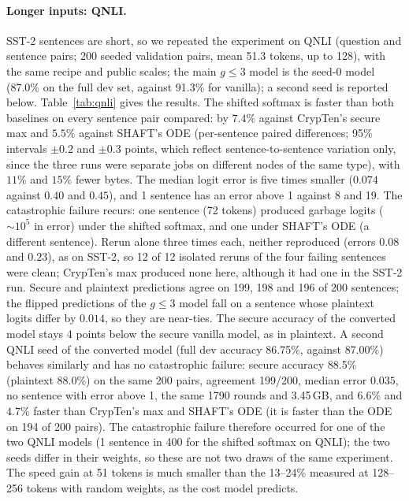 \documentclass[11pt]{article}
\begin{document}
\paragraph{Longer inputs: QNLI.} SST-2 sentences are short, so we repeated the experiment on QNLI (question and sentence pairs; 200
seeded validation pairs, mean 51.3 tokens, up to 128), with the same recipe and public scales; the main $g\le3$ model is the seed-0
model (87.0\% on the full dev set, against 91.3\% for vanilla); a second seed is reported below. Table~\ref{tab:qnli} gives the results. The shifted softmax is faster
than both baselines on every sentence pair compared: by $7.4\%$ against CrypTen's secure max and $5.5\%$ against SHAFT's ODE
(per-sentence paired differences; 95\% intervals $\pm0.2$ and $\pm0.3$ points, which reflect sentence-to-sentence variation only, since the
three runs were separate jobs on different nodes of the same type), with $11\%$ and $15\%$ fewer bytes. The median logit error is five
times smaller ($0.074$ against $0.40$ and $0.45$), and 1 sentence has an error above 1 against 8 and 19. The catastrophic failure
recurs: one sentence (72 tokens) produced garbage logits ($\sim\!10^{5}$ in error) under the shifted softmax, and one under SHAFT's ODE
(a different sentence). Rerun alone three times each, neither reproduced (errors $0.08$ and $0.23$), as on SST-2, so 12 of 12 isolated
reruns of the four failing sentences were clean; CrypTen's max produced none here, although it had one in the SST-2 run. Secure and plaintext predictions
agree on 199, 198 and 196 of 200 sentences; the flipped predictions of the $g\le3$ model fall on a sentence whose plaintext logits differ by
$0.014$, so they are near-ties. The secure accuracy of the converted model stays 4 points below the secure vanilla model, as in plaintext.
A second QNLI seed of the converted model (full dev accuracy 86.75\%, against 87.00\%) behaves similarly and has no catastrophic failure: secure
accuracy 88.5\% (plaintext 88.0\%) on the same 200 pairs, agreement 199/200, median error $0.035$, no sentence with error above 1, the same
1790 rounds and 3.45\,GB, and $6.6\%$ and $4.7\%$ faster than CrypTen's max and SHAFT's ODE (it is faster than the ODE on 194 of 200 pairs). The
catastrophic failure therefore occurred for one of the two QNLI models (1 sentence in 400 for the shifted softmax on QNLI); the two seeds differ in
their weights, so these are not two draws of the same experiment. The speed gain at 51 tokens is much smaller than the 13--24\% measured at 128--256 tokens with random weights, as the cost model predicts.
\end{document}
